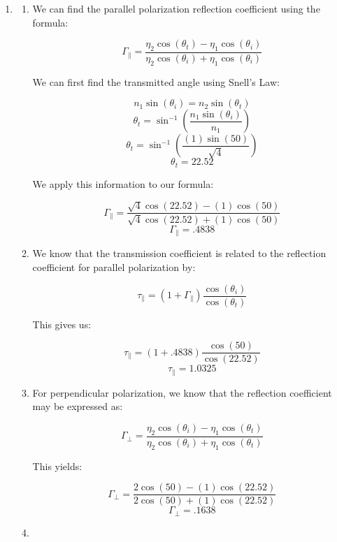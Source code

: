 \begin{enumerate}
\begin{enumerate}
    \end{enumerate}

  \item

    \begin{enumerate}

      \item 

        We can find the parallel polarization reflection coefficient using the formula:

        $$\Gamma_{\parallel}=\frac{\eta_2\cos(\theta_t)-\eta_1\cos(\theta_i)}{\eta_2\cos(\theta_i)+\eta_1\cos(\theta_i)}$$

        We can first find the transmitted angle using Snell's Law:

        $$n_1\sin(\theta_i)=n_2\sin(\theta_t)$$
        $$\theta_t=\sin^{-1}\left(\frac{n_1\sin(\theta_i)}{n_1}\right)$$
        $$\theta_t=\sin^{-1}\left(\frac{(1)\sin(50)}{\sqrt{4}}\right)$$
        $$\theta_t=22.52$$

        We apply this information to our formula:

        $$\Gamma_{\parallel}=\frac{\sqrt{4}\cos(22.52)-(1)\cos(50)}{\sqrt{4}\cos(22.52)+(1)\cos(50)}$$
        $$\boxed{\Gamma_{\parallel}=.4838}$$


      \item 

        We know that the transmission coefficient is related to the reflection coefficient for parallel polarization by:

        $$\tau_{\parallel}=(1+\Gamma_{\parallel})\frac{\cos(\theta_i)}{\cos(\theta_t)}$$

        This gives us:

        $$\tau_{\parallel}=(1+.4838)\frac{\cos(50)}{\cos(22.52)}$$
        $$\boxed{\tau_{\parallel}=1.0325}$$

      \item 

        For perpendicular polarization, we know that the reflection coefficient may be expressed as:

        $$\Gamma_{\perp}=\frac{\eta_2\cos(\theta_i)-\eta_1\cos(\theta_t)}{\eta_2\cos(\theta_i)+\eta_1\cos(\theta_t)}$$

        This yields:

        $$\Gamma_{\perp}=\frac{2\cos(50)-(1)\cos(22.52)}{2\cos(50)+(1)\cos(22.52)}$$
        $$\boxed{\Gamma_{\perp}=.1638}$$

      \item 


\end{enumerate}
\end{enumerate}
